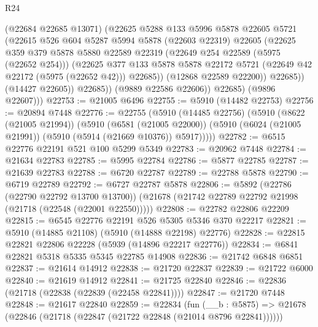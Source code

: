 \begin{lexlean}{R24}
\begin{coremodule}
                    (@22684 @22685 @13071)
                    (@22625
                      @5288
                      @133
                      @5996
                      @5878
                      @22605
                      @5721
                      (@22615
                        @526
                        @604
                        @5287
                        @5994
                        @5878
                        (@22603 @22319)
                        @22605
                        (@22625
                          @359
                          @379
                          @5878
                          @5880
                          @22589
                          @22319
                          (@22649 @254 @22589 (@5975 (@22652 @254)))
                          (@22625
                            @377
                            @133
                            @5878
                            @5878
                            @22172
                            @5721
                            (@22649 @42 @22172 (@5975 (@22652 @42)))
                            @22685))
                        (@12868 @22589 @22200))
                      @22685))
                  (@14427 @22605))
                @22685))
            (@9889 @22586 @22606))
          @22685)
        (@9896 @22607)))
@22753 := @21005 @6496
@22755 := @5910 (@14482 @22753)
@22756 := @20894 @7448
@22776 := @22755
    (@5910
      (@14485 @22756)
      (@5910
        (@8622 (@21005 @21994))
        (@5910
          (@6581 (@21005 @22000))
          (@5910 (@6024 (@21005 @21991)) (@5910 (@5914 (@21669 @10376)) @5917)))))
@22782 := @6515 @22776 @22191 @521 @100 @5299 @5349
@22783 := @20962 @7448
@22784 := @21634 @22783
@22785 := @5995 @22784
@22786 := @5877 @22785
@22787 := @21639 @22783
@22788 := @6720 @22787
@22789 := @22788 @5878
@22790 := @6719 @22789
@22792 := @6727 @22787 @5878
@22806 := @5892
    (@22786 (@22790 @22792 @13700 @13700))
    (@21678 (@21742 @22789 @22792 @21998 (@21718 (@22548 (@22001 @22550)))))
@22808 := @22782 @22806 @22209
@22815 := @6545 @22776 @22191 @526 @5305 @5346 @370 @22217
@22821 := @5910 (@14885 @21108) (@5910 (@14888 @22198) @22776)
@22828 := @22815 @22821 @22806 @22228 (@5939 (@14896 @22217 @22776))
@22834 := @6841 @22821 @5318 @5335 @5345 @22785 @14908
@22836 := @21742 @6848 @6851
@22837 := @21614 @14912
@22838 := @21720 @22837
@22839 := @21722 @6000
@22840 := @21619 @14912
@22841 := @21725 @22840
@22846 := @22836 (@21718 (@22838 (@22839 (@22458 @22841))))
@22847 := @21720 @7448
@22848 := @21617 @22840
@22859 := @22834
    (fun (__b : @5875) => @21678 (@22846 (@21718 (@22847 (@21722 @22848 (@21014 @8796 @22841))))))

\end{coremodule}
\end{lexlean}
